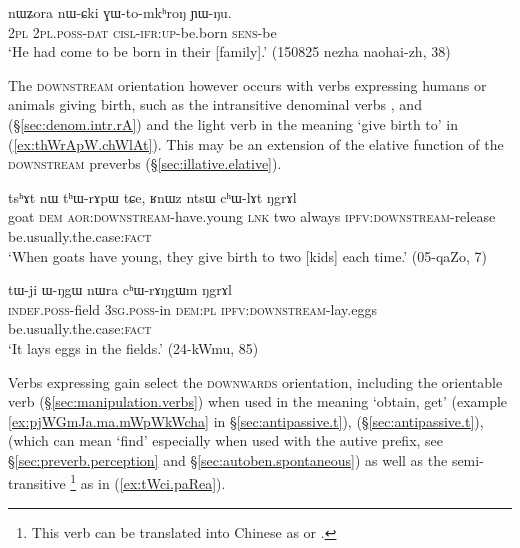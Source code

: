 \begin{exe}
\ex \label{ex:GWtomkhroN}
\gll nɯʑora nɯ-ɕki ɣɯ-to-mkʰroŋ ɲɯ-ŋu.  \\
\textsc{2pl} \textsc{2pl}.\textsc{poss}-\textsc{dat} \textsc{cisl}-\textsc{ifr}:\textsc{up}-be.born \textsc{sens}-be \\
\glt `He had come to be born in their [family].' (150825 nezha naohai-zh, 38)
\end{exe}

The \textsc{downstream} orientation however occurs with verbs expressing humans or animals giving birth, such as the intransitive denominal verbs ,  and  (§\ref{sec:denom.intr.rA}) and the light verb  in the meaning `give birth to' in (\ref{ex:thWrApW.chWlAt}). This may be an extension of the elative function of the \textsc{downstream} preverbs (§\ref{sec:illative.elative}).

\begin{exe}
\ex \label{ex:thWrApW.chWlAt}
\gll tsʰɤt nɯ tʰɯ-rɤpɯ tɕe, ʁnɯz ntsɯ cʰɯ-lɤt ŋgrɤl \\
goat \textsc{dem} \textsc{aor}:\textsc{downstream}-have.young \textsc{lnk} two always \textsc{ipfv}:\textsc{downstream}-release be.usually.the.case:\textsc{fact} \\
\glt `When goats have young, they give birth to two [kids] each time.' (05-qaZo, 7)
\end{exe}

\begin{exe}
\ex \label{ex:chWrANgWm}
\gll tɯ-ji ɯ-ŋgɯ nɯra cʰɯ-rɤŋgɯm ŋgrɤl \\
\textsc{indef}.\textsc{poss}-field \textsc{3sg}.\textsc{poss}-in \textsc{dem}:\textsc{pl} \textsc{ipfv}:\textsc{downstream}-lay.eggs be.usually.the.case:\textsc{fact} \\
\glt `It lays eggs in the fields.' (24-kWmu, 85)
\end{exe}

Verbs expressing gain select the \textsc{downwards} orientation, including the orientable verb  (§\ref{sec:manipulation.verbs}) when used in the meaning `obtain, get' (example \ref{ex:pjWGmJa.ma.mWpWkWcha} in §\ref{sec:antipassive.t}),  (§\ref{sec:antipassive.t}),  (which can mean `find' especially when used with the autive prefix, see §\ref{sec:preverb.perception} and §\ref{sec:autoben.spontaneous}) as well as the semi-transitive \footnote{This verb can be translated into Chinese as  or .} as in (\ref{ex:tWci.paRea}).
  
